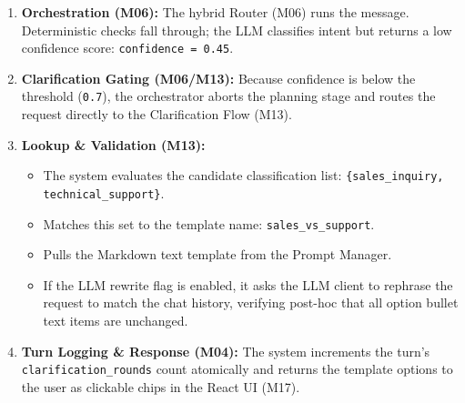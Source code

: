 \documentclass[11pt,a4paper]{article}
\begin{document}
\begin{enumerate}
    \item \textbf{Orchestration (M06):} The hybrid Router (M06) runs the message. Deterministic checks fall through; the LLM classifies intent but returns a low confidence score: \texttt{confidence = 0.45}.
    \item \textbf{Clarification Gating (M06/M13):} Because confidence is below the threshold (\texttt{0.7}), the orchestrator aborts the planning stage and routes the request directly to the Clarification Flow (M13).
    \item \textbf{Lookup \& Validation (M13):}
    \begin{itemize}
        \item The system evaluates the candidate classification list: \texttt{\{sales_inquiry, technical_support\}}.
        \item Matches this set to the template name: \texttt{sales_vs_support}.
        \item Pulls the Markdown text template from the Prompt Manager.
        \item If the LLM rewrite flag is enabled, it asks the LLM client to rephrase the request to match the chat history, verifying post-hoc that all option bullet text items are unchanged.
    \end{itemize}
    \item \textbf{Turn Logging \& Response (M04):} The system increments the turn's \texttt{clarification_rounds} count atomically and returns the template options to the user as clickable chips in the React UI (M17).
\end{enumerate}
\end{document}
